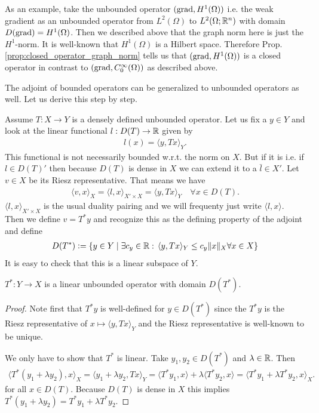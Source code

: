 \documentclass[../master_thesis.tex]{subfiles}
\begin{document}
As an example, take the unbounded operator $(\operatorname{grad}, H^1(\Omega))$
i.e. the weak gradient as an unbounded operator 
from $L^2(\Omega)$ to $L^2(\Omega;\mathbb{R}^n)$ with 
domain $D(\operatorname{grad}) = H^1(\Omega)$. Then we described above that the 
graph norm here is just the $H^1$-norm. It is well-known that 
$H^1(\Omega)$ is a Hilbert space. Therefore 
Prop.\,\ref{prop:closed_operator_graph_norm} tells us that 
$(\operatorname{grad}, H^1(\Omega))$ is a closed operator in contrast to 
$(\operatorname{grad}, C_0^\infty(\Omega))$ as described above.

The adjoint of bounded operators can be generalized to unbounded operators 
as well. Let us derive this step by step. 

Assume $T: X \rightarrow Y$ is a densely defined unbounded operator. 
Let us fix a $y \in Y$ and 
look at the linear functional $l:D(T) \rightarrow \mathbb{R}$ given by
\begin{align*}
    l(x) = \langle y, Tx \rangle_Y.
\end{align*}
This functional is not necessarily bounded w.r.t. the norm on $X$. But if it is i.e. if $l \in D(T)'$ 
then because $D(T)$ is dense in $X$ we can extend it to a
$\bar{l} \in X'$. Let $v \in X$ be its Riesz representative. That means we have
\begin{align*}
    \langle v, x \rangle_X = \langle l, x \rangle_{X'\times X} = \langle y, Tx \rangle_Y 
        \quad \forall x \in D(T).
\end{align*}
$\langle l, x \rangle_{X'\times X}$ is the usual duality pairing and we will 
frequenty just write $\langle l, x \rangle$.
Then we define $v = T^* y$ and 
recognize this as the defining property of the adjoint and define 
\begin{align*}
    D(T^*) \vcentcolon= \{ y \in Y \mid \exists c_y \in \mathbb{R}:
        \,\langle y, Tx \rangle_Y \leq c_y \lVert x \rVert _X \forall x \in X\}
\end{align*}
It is easy to check that this is a linear subspace of $Y$.

\begin{proposition}
    $T^*: Y \rightarrow X $ is a linear unbounded operator with domain $D(T^*)$.
\end{proposition}
\begin{proof}
    Note first that $T^*y$ is well-defined for $y \in D(T^*)$ since the 
    $T^*y$ is the Riesz representative of $x \mapsto \langle y, Tx \rangle_Y$ 
    and the Riesz representative is well-known to be unique.

    We only have to show that $T^*$ is linear. Take $y_1, y_2 \in D(T^*)$ 
    and $\lambda \in \mathbb{R}$. Then
    \begin{align*}
        \langle T^*(y_1 + \lambda y_2), x \rangle _X
        = \langle y_1 + \lambda y_2, Tx \rangle _Y
        = \langle T^*y_1, x \rangle + \lambda \langle T^*y_2, x \rangle
        = \langle T^*y_1 + \lambda T^*y_2, x\rangle_X.
    \end{align*}
    for all $x \in D(T)$. Because $D(T)$ is dense in $X$ this implies 
    $T^*(y_1 + \lambda y_2) = T^*y_1 + \lambda T^*y_2$.
\end{proof}
\end{document}
